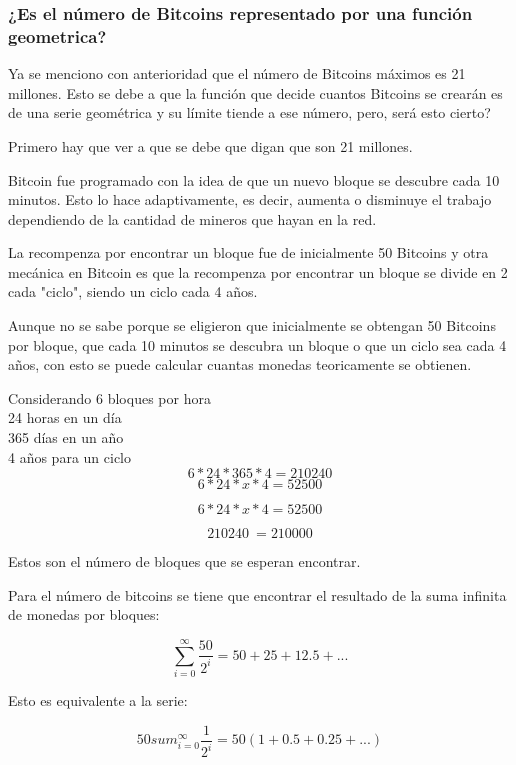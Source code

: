 \documentclass[12pt,letterpaper]{article}
\begin{document}
    \subsubsection*{¿Es el número de Bitcoins representado por una función geometrica?}

    Ya se menciono con anterioridad que el n\'umero de Bitcoins m\'aximos es 21 millones. Esto se debe a que la funci\'on que decide cuantos Bitcoins se crear\'an es de una serie geom\'etrica y su l\'imite tiende a ese n\'umero, pero, ser\'a esto cierto? 

    Primero hay que ver a que se debe que digan que son 21 millones.

    Bitcoin fue programado con la idea de que un nuevo bloque se descubre cada 10 minutos. Esto lo hace adaptivamente, es decir, aumenta o disminuye el trabajo dependiendo de la cantidad de mineros que hayan en la red.

    La recompenza por encontrar un bloque fue de inicialmente 50 Bitcoins y otra mec\'anica en Bitcoin es que la recompenza por encontrar un bloque se divide en 2 cada "ciclo", siendo un ciclo cada 4 a\~nos.

    Aunque no se sabe porque se eligieron que inicialmente se obtengan 50 Bitcoins por bloque, que cada 10 minutos se descubra un bloque o que un ciclo sea cada 4 a\~nos, con esto se puede calcular cuantas monedas teoricamente se obtienen.

    Considerando 6 bloques por hora \\
                 24 horas en un d\'ia \\
                 365 d\'ias en un a\~no \\
                 4 a\~nos para un ciclo \\

    $$6 * 24 * 365 * 4 = 210240$$
    $$6 * 24 * x * 4 = 52500$$

    $$6 * 24 * x * 4 = 52500$$

    $$210240 ~= 210000$$

    Estos son el n\'umero de bloques que se esperan encontrar.

    Para el n\'umero de bitcoins se tiene que encontrar el resultado de la suma infinita de monedas por bloques:
    
    $$ \sum_{i = 0}^{\infty} \frac{50}{2^{i}} = 50 + 25 + 12.5 + ...$$

    Esto es equivalente a la serie:

    $$ 50 sum_{i = 0}^{\infty} \frac{1}{2^{i}} = 50 (1 + 0.5 + 0.25 + ...) $$
\end{document}

